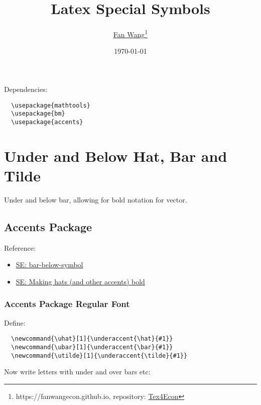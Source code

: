 \documentclass[12pt,english]{article}
\title{Latex Special Symbols}
\author{\href{https://fanwangecon.github.io/}{Fan Wang}\thanks{https://fanwangecon.github.io, repository: \href{https://fanwangecon.github.io/Tex4Econ/}{Tex4Econ}}}
\date{\today}
\begin{document}
\maketitle

Dependencies:
\begin{verbatim}
  \usepackage{mathtools}
  \usepackage{bm}
  \usepackage{accents}
\end{verbatim}

\section{Under and Below Hat, Bar and Tilde}

Under and below bar, allowing for bold notation for vector.

\subsection{Accents Package}

Reference:
\begin{itemize}
  \item \href{https://tex.stackexchange.com/questions/125412/bar-below-symbol}{SE: bar-below-symbol}
  \item \href{https://tex.stackexchange.com/questions/66537/making-hats-and-other-accents-bold}{SE: Making hats (and other accents) bold}
\end{itemize}

\subsubsection{Accents Package Regular Font}

Define:

\newcommand{\uhat}[1]{\underaccent{\hat}{#1}}
\newcommand{\ubar}[1]{\underaccent{\bar}{#1}}
\newcommand{\utilde}[1]{\underaccent{\tilde}{#1}}
\begin{verbatim}
  \newcommand{\uhat}[1]{\underaccent{\hat}{#1}}
  \newcommand{\ubar}[1]{\underaccent{\bar}{#1}}
  \newcommand{\utilde}[1]{\underaccent{\tilde}{#1}}
\end{verbatim}

Now write letters with under and over bars etc:
\end{document}
